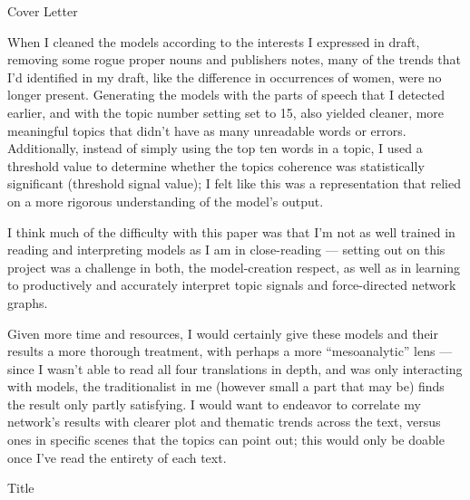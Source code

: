 \documentclass[12pt]{article}
\newenvironment{coverletter}{\begin{center} Cover Letter \end{center}}{\newpage }
\begin{document}
\begin{flushleft}
\begin{spacing}{2.0}
\begin{coverletter}
When I cleaned the models according to the interests I expressed in draft, removing some rogue proper nouns and publishers notes, many of the trends that I'd identified in my draft, like the difference in occurrences of women, were no longer present. Generating the models with the parts of speech that I detected earlier, and with the topic number setting set to 15, also yielded cleaner, more meaningful topics that didn't have as many unreadable words or errors. Additionally, instead of simply using the top ten words in a topic, I used a threshold value to determine whether the topics coherence was statistically significant (threshold signal value); I felt like this was a representation that relied on a more rigorous understanding of the model's output.\linebreak

I think much of the difficulty with this paper was that I'm not as well trained in reading and interpreting models as I am in close-reading --- setting out on this project was a challenge in both, the model-creation respect, as well as in learning to productively and accurately interpret topic signals and force-directed network graphs. \linebreak

Given more time and resources, I would certainly give these models and their results a more thorough treatment, with perhaps a more ``mesoanalytic'' lens --- since I wasn't able to read all four translations in depth, and was only interacting with models, the traditionalist in me (however small a part that may be) finds the result only partly satisfying. I would want to endeavor to correlate my network's results with clearer plot and thematic trends across the text, versus ones in specific scenes that the topics can point out; this would only be doable once I've read the entirety of each text.

\end{coverletter}


\begin{center}
Title
\end{center}

\setlength{\parindent}{0.5in}


\end{spacing}
\end{flushleft}
\end{document}
